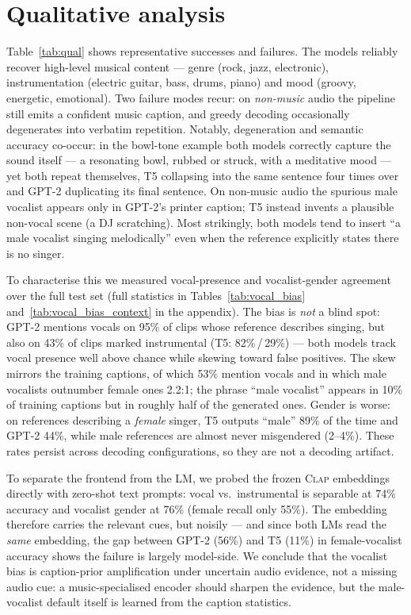 \documentclass[9pt]{report}
\newcommand{\clapenc}{\textsc{Clap}}
\begin{document}
\section{Qualitative analysis}\label{sec:qual}
Table~\ref{tab:qual} shows representative successes and failures. The models reliably recover
high-level musical content --- genre (rock, jazz, electronic), instrumentation (electric guitar,
bass, drums, piano) and mood (groovy, energetic, emotional). Two failure modes recur: on
\emph{non-music} audio the pipeline still emits a confident music caption, and greedy decoding
occasionally degenerates into verbatim repetition. Notably, degeneration and semantic accuracy
co-occur: in the bowl-tone example both models correctly capture the sound itself --- a
resonating bowl, rubbed or struck, with a meditative mood --- yet both repeat themselves, T5
collapsing into the same sentence four times over and GPT-2 duplicating its final sentence.
On non-music audio the spurious male vocalist appears only in GPT-2's printer caption; T5
instead invents a plausible non-vocal scene (a DJ scratching). Most strikingly, both models tend to insert
``a male vocalist singing melodically'' even when the reference explicitly states there is no
singer.

To characterise this we measured vocal-presence and vocalist-gender agreement over the full
test set (full statistics in Tables~\ref{tab:vocal_bias} and~\ref{tab:vocal_bias_context} in
the appendix). The bias is \emph{not} a blind spot: GPT-2 mentions vocals on 95\% of clips whose
reference describes singing, but also on 43\% of clips marked instrumental (T5: 82\%\,/\,29\%)
--- both models track vocal presence well above chance while skewing toward false positives.
The skew mirrors the training captions, of which 53\% mention vocals and in which male
vocalists outnumber female ones 2.2:1; the phrase ``male vocalist'' appears in 10\% of training
captions but in roughly half of the generated ones. Gender is worse: on references describing a
\emph{female} singer, T5 outputs ``male'' 89\% of the time and GPT-2 44\%, while male
references are almost never misgendered (2--4\%). These rates persist across decoding
configurations, so they are not a decoding artifact.

To separate the frontend from the LM, we probed the frozen \clapenc{} embeddings directly with
zero-shot text prompts: vocal vs.\ instrumental is separable at 74\% accuracy and vocalist
gender at 76\% (female recall only 55\%). The embedding therefore carries the relevant cues,
but noisily --- and since both LMs read the \emph{same} embedding, the gap between GPT-2
(56\%) and T5 (11\%) in female-vocalist accuracy shows the failure is largely model-side. We
conclude that the vocalist bias is caption-prior amplification under uncertain audio evidence,
not a missing audio cue: a music-specialised encoder should sharpen the evidence, but the
male-vocalist default itself is learned from the caption statistics.
\end{document}
